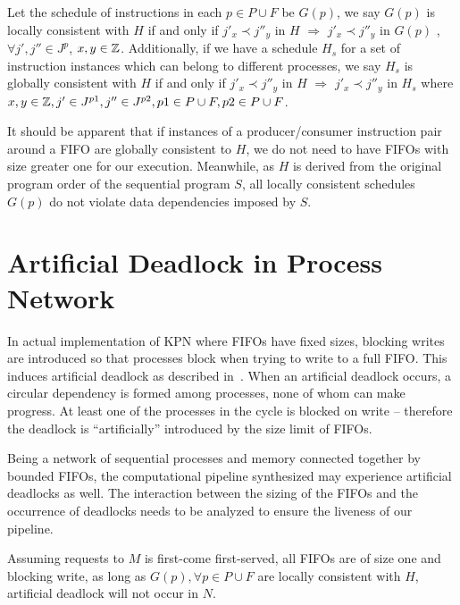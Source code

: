 \begin{definition}
Let the schedule of instructions in each $p \in P \cup F$ be $G(p)$, we say $G(p)$ is locally consistent with $H$ if
and only if
$j'_x \prec j''_y$ in $H$ $\Rightarrow$ $j'_x \prec j''_y$ in $G(p)$
, $\forall j', j'' \in J^p$, 
$x, y \in \Bbb{Z}$. Additionally, if we have a schedule $H_s$ for a set of instruction instances  which can belong to different processes, we say $H_s$ is globally consistent with
$H$ if and only if $j'_x \prec j''_y$ in $H$ $\Rightarrow$ $j'_x \prec j''_y$ in $H_s$
 where  $x,y \in \Bbb{Z}, j' \in J^{p1}, j'' \in J^{p2}, p1 \in P \cup F, p2 \in P \cup F$.
\end{definition}


It should be apparent that if instances of a producer/consumer
instruction pair around a FIFO are globally consistent to $H$, we
do not need to have FIFOs with size greater one for our execution.
Meanwhile, as $H$ is derived from the original program order of
the sequential program $S$, all locally consistent schedules $G(p)$ 
do not violate data dependencies imposed by $S$.


\section{Artificial Deadlock in Process Network}
In actual implementation of KPN where FIFOs have fixed sizes, blocking
writes are introduced so that processes block when trying to write to a full FIFO.
This induces artificial deadlock as described in~\cite{}. 
When an artificial deadlock occurs, a circular dependency is formed among
processes, none of whom can make progress. At least one of the processes
in the cycle is blocked on write -- therefore the deadlock is ``artificially''
introduced by the size limit of FIFOs. 

Being a network of sequential processes and memory connected together by
bounded FIFOs, the computational pipeline synthesized may experience
artificial deadlocks as well. The interaction between the sizing of the FIFOs 
and the occurrence of deadlocks needs to be analyzed to ensure the liveness
of our pipeline.

\begin{lemma}
\label{nondeadlock}
Assuming requests to $M$ is first-come first-served,
all FIFOs are of size one and blocking write,
as long as $G(p), \forall p \in P \cup F$ are locally consistent with $H$,
artificial deadlock will not occur in $N$. 
\end{lemma}

